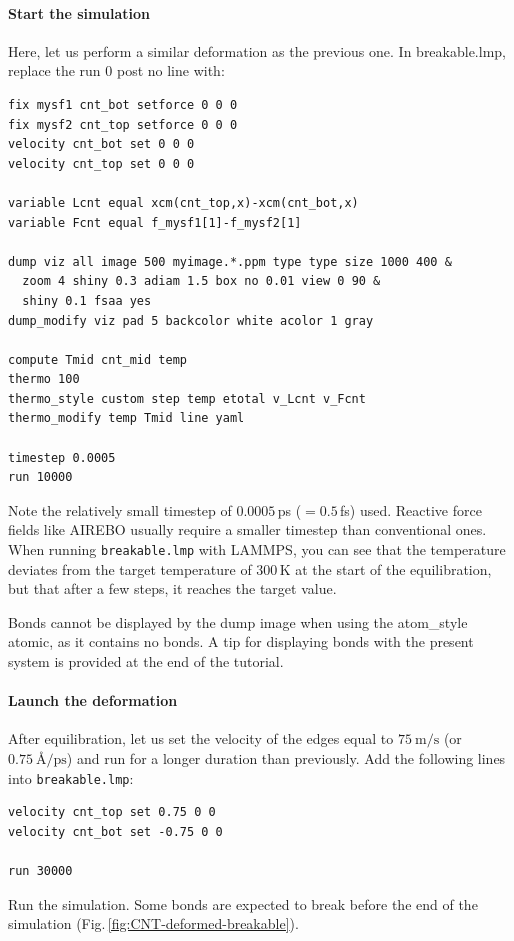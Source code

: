 \documentclass[9pt,tutorial]{livecoms}
\newcommand{\lmpcmd}[1]{\hspace{0pt}\colorbox{listing}{\textcolor{command}{\small{#1}}}\hspace{0pt}} %
\newcommand{\lmpcmdnote}[1]{\hspace{0pt}\colorbox{note_listing}{\textcolor{command}{\small{#1}}}\hspace{0pt}} %
\newcommand{\flecmd}[1]{\textcolor{command}{\texttt{#1}}} %
\begin{document}
\paragraph{Start the simulation}

Here, let us perform a similar deformation as the previous one.
In \lmpcmd{breakable.lmp}, replace the \lmpcmd{run 0 post no} line with:
\begin{lstlisting}
fix mysf1 cnt_bot setforce 0 0 0
fix mysf2 cnt_top setforce 0 0 0
velocity cnt_bot set 0 0 0
velocity cnt_top set 0 0 0

variable Lcnt equal xcm(cnt_top,x)-xcm(cnt_bot,x)
variable Fcnt equal f_mysf1[1]-f_mysf2[1]

dump viz all image 500 myimage.*.ppm type type size 1000 400 &
  zoom 4 shiny 0.3 adiam 1.5 box no 0.01 view 0 90 &
  shiny 0.1 fsaa yes
dump_modify viz pad 5 backcolor white acolor 1 gray

compute Tmid cnt_mid temp
thermo 100
thermo_style custom step temp etotal v_Lcnt v_Fcnt
thermo_modify temp Tmid line yaml

timestep 0.0005
run 10000
\end{lstlisting}
Note the relatively small timestep of $0.0005$\,ps ($= 0.5$\,fs) used.  Reactive force
fields like AIREBO usually require a smaller timestep than conventional ones.  When running
\flecmd{breakable.lmp} with LAMMPS, you can see that the temperature deviates
from the target temperature of $300\,\text{K}$ at the start of the equilibration,
but that after a few steps, it reaches the target value.

\begin{note}
  Bonds cannot be displayed by the \lmpcmdnote{dump image} when using
  the \lmpcmdnote{atom\_style atomic}, as it contains no bonds.
  A tip for displaying bonds with the present system is provided at
  the end of the tutorial.
\end{note}

\paragraph{Launch the deformation}

After equilibration, let us set the velocity of the edges equal to
$75~\text{m/s}$ (or $0.75~\text{\AA{}/ps}$) and run for a longer duration than
previously. Add the following lines into \flecmd{breakable.lmp}:
\begin{lstlisting}
velocity cnt_top set 0.75 0 0
velocity cnt_bot set -0.75 0 0

run 30000
\end{lstlisting}
Run the simulation.  Some bonds are expected to break before the end of the
simulation (Fig.\,\ref{fig:CNT-deformed-breakable}).
\end{document}
